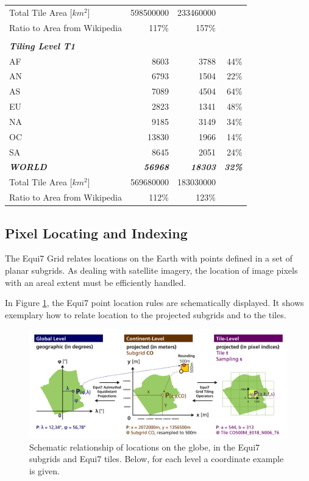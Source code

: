 \documentclass[10pt,a4paper]{article}
\begin{document}
\begin{table}[htbp]
\begin{tabular}{lrrr}
    \hline
    Total Tile Area [$km^{2}$] & 598500000 & 233460000 &  \\
    Ratio to Area from Wikipedia & 117\% & 157\% &  \\
    \hline
    \\   
    \textit{\textbf{Tiling Level T1}} \\
    AF    & 8603  & 3788  & 44\% \\
    AN    & 6793  & 1504  & 22\% \\
    AS    & 7089  & 4504  & 64\% \\
    EU    & 2823  & 1341  & 48\% \\
    NA    & 9185  & 3149  & 34\% \\
    OC    & 13830 & 1966  & 14\% \\
    SA    & 8645  & 2051  & 24\% \\
    \hline
    \textit{\textbf{WORLD}} & \textit{\textbf{56968}} & \textit{\textbf{18303}} & \textit{\textbf{32\%}} \\
    \hline
    Total Tile Area [$km^{2}$] & 569680000 & 183030000 &  \\
    Ratio to Area from Wikipedia & 112\% & 123\% &  \\
	\hline
    \end{tabular}%
  \label{tab:tilestatistics}%
\end{table}%

\newpage

\subsection{Pixel Locating and Indexing}

The Equi7 Grid relates locations on the Earth with points defined in a set of planar subgrids. As dealing with satellite imagery, the location of image pixels with an areal extent must be efficiently handled.

In Figure \ref{fig:pixel_identification}, the Equi7 point location rules are schematically displayed. It shows exemplary how to relate location to the projected subgrids and to the tiles.

\begin{figure}[hbtp]
\centering
\includegraphics[width=1.0\textwidth]{equi7_v13_pixel_identification}
\caption{
Schematic relationship of locations on the globe, in the Equi7 subgrids and Equi7 tiles. Below, for each level a coordinate example is given.
}
\label{fig:pixel_identification}
\end{figure}
\end{document}
